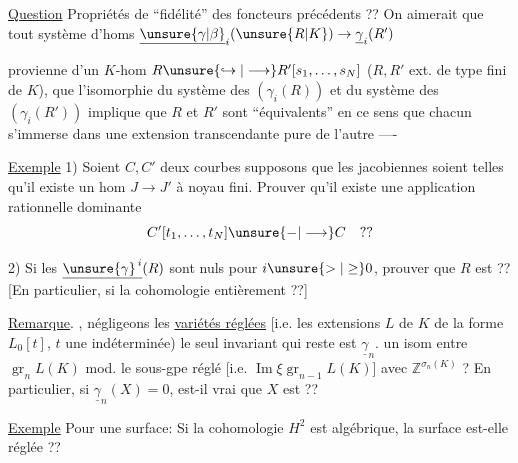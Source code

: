 \uline{Question} 
Propriétés de
``fidélité''  des foncteurs précédents ??
On aimerait
que tout  système d'homs
$\underline{\unsure{\gamma|\beta}}_i(\unsure{R|K})\to
\underline{\gamma}_i(R')$

provienne d'un $K$-hom
$R\unsure{\hookrightarrow|\longrightarrow}R'[s_1,\ldots,s_N]$
($R,R'$ ext. de type fini de $K$),
que l'isomorphie du système des
$(\gamma_i(R))$ et du système des $(\gamma_i(R'))$
implique que $R$ et $R'$ sont ``équivalents''
en ce sens que chacun s'immerse
dans une extension transcendante pure
de l'autre ----

\uline{Exemple} 1) Soient $C,C'$ deux courbes
supposons que les jacobiennes soient telles
qu'il existe un hom $J\to J'$ à
noyau fini. Prouver qu'il existe
 une application rationnelle dominante
\[
C'[t_1,\ldots,t_N]\unsure{-|\longrightarrow}C\quad ??
\]

2) Si les $\underline{\unsure{\gamma}^{\,i}}(R)$ sont nuls pour
$i\unsure{>|\geq}0$,
prouver que $R$ est  ??
[En particulier, si la cohomologie
entièrement  ??]

\uline{Remarque}. , négligeons les
\uline{variétés réglées} 
[i.e. les extensions $L$ de $K$
de la forme $L_0[t]$, $t$ une indéterminée)
le seul invariant  qui reste est
$\underline{\gamma}_n$.
 un isom entre
$\operatorname{gr}_nL(K)$ mod. le sous-gpe réglé
[i.e. $\operatorname{Im}\xi\operatorname{gr}_{n-1}L(K)$] avec
$\mathbb{Z}^{\sigma_n(K)}$ ?
En particulier, si
$\underline{\gamma}_n(X)=0$, 
est-il vrai que $X$
est  ??

\uline{Exemple} Pour une surface: Si la cohomologie
$H^2$ est algébrique, la surface est-elle
réglée ??
